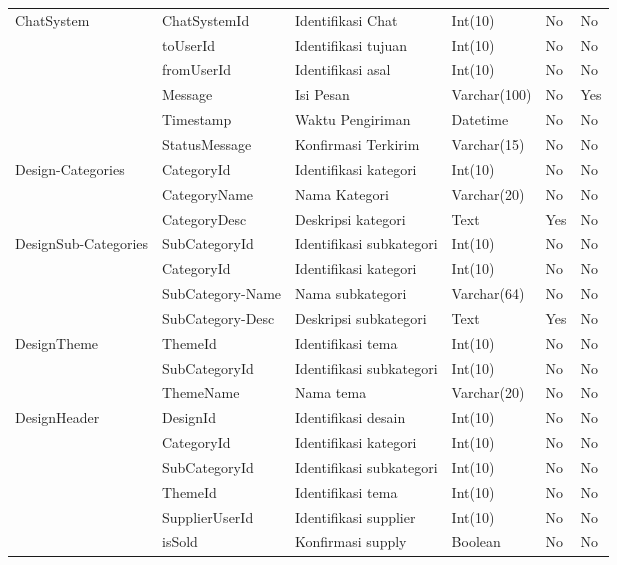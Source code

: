 \begin{longtable}{| p{2.2cm} | p{2.5cm} | p{3.4cm} | p{2.2cm} | l | p{1.3cm} |}
		ChatSystem	& ChatSystemId	& Identifikasi Chat		& Int(10)		& No & No \\
					& toUserId		& Identifikasi tujuan	& Int(10)		& No & No \\
					& fromUserId	& Identifikasi asal		& Int(10)		& No & No \\
					& Message		& Isi Pesan				& Varchar(100)	& No & Yes \\
					& Timestamp		& Waktu Pengiriman		& Datetime		& No & No \\
					& StatusMessage	& Konfirmasi Terkirim	& Varchar(15)	& No & No \\ \hline
					
		Design-Categories	& CategoryId	& Identifikasi kategori	& Int(10)		& No  & No \\
							& CategoryName	& Nama Kategori			& Varchar(20)	& No  & No \\
							& CategoryDesc	& Deskripsi kategori	& Text			& Yes & No \\ \hline
		
		DesignSub-Categories	& SubCategoryId		& Identifikasi subkategori	& Int(10)		& No  & No \\
							& CategoryId		& Identifikasi kategori		& Int(10)		& No  & No \\
							& SubCategory-Name	& Nama subkategori			& Varchar(64)	& No  & No \\
							& SubCategory-Desc	& Deskripsi subkategori		& Text			& Yes & No \\ \hline
							
		DesignTheme	& ThemeId		& Identifikasi tema			& Int(10)		& No & No \\
					& SubCategoryId	& Identifikasi subkategori	& Int(10)		& No & No \\
					& ThemeName		& Nama tema					& Varchar(20)	& No & No \\ \hline

		DesignHeader	& DesignId			& Identifikasi desain		& Int(10)	& No & No \\
						& CategoryId		& Identifikasi kategori		& Int(10)	& No & No \\
						& SubCategoryId		& Identifikasi subkategori	& Int(10)	& No & No \\
						& ThemeId			& Identifikasi tema			& Int(10)	& No & No \\
						& SupplierUserId	& Identifikasi supplier		& Int(10)	& No & No \\
						& isSold			& Konfirmasi supply			& Boolean	& No & No \\ \hline
		

\end{longtable}
